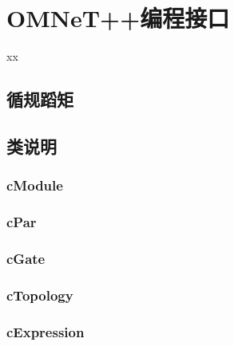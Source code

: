 \chapter{OMNeT++编程接口}

\begin{summary}
xx\\
\end{summary}

\section{循规蹈矩}


\section{类说明}



\subsection{cModule}


\subsection{cPar}


\subsection{cGate}


\subsection{cTopology}


\subsection{cExpression}



